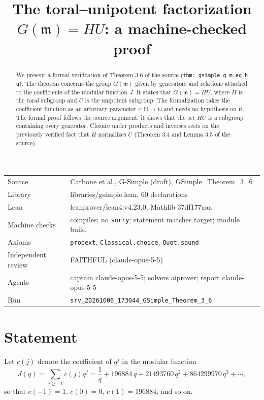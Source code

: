 \documentclass[11pt]{article}
\title{The toral--unipotent factorization $G(\mathfrak{m}) = HU$: a machine-checked proof}
\date{}
\theoremstyle{definition}
\theoremstyle{remark}
\begin{document}
\maketitle
\begin{abstract}
We present a formal verification of Theorem 3.6 of the source (\texttt{thm: gsimple g m eq h u}). The theorem concerns the group $G(\mathfrak{m})$ given by generators and relations attached to the coefficients of the modular function $J$. It states that $G(\mathfrak{m})=HU$, where $H$ is the toral subgroup and $U$ is the unipotent subgroup. The formalization takes the coefficient function as an arbitrary parameter $c\colon\mathbb{N}\to\mathbb{N}$ and needs no hypothesis on it. The formal proof follows the source argument: it shows that the set $HU$ is a subgroup containing every generator. Closure under products and inverses rests on the previously verified fact that $H$ normalizes $U$ (Theorem 3.4 and Lemma 3.5 of the source).
\end{abstract}

\begin{center}\small
\begin{tabular}{@{}ll@{}}
\toprule
Source & Carbone et al., G-Simple (draft), GSimple\_Theorem\_3\_6 \\
Library & libraries/gsimple.lean, 60 declarations \\
Lean & leanprover/lean4:v4.23.0, Mathlib 37df177aaa \\
Machine checks & compiles; no \texttt{sorry}; statement matches target; module build \\
Axioms & \texttt{propext}, \texttt{Classical.choice}, \texttt{Quot.sound} \\
Independent review & FAITHFUL (claude-opus-5-5) \\
Agents & captain claude-opus-5-5; solvers aiprover; report claude-opus-5-5 \\
Run & \texttt{srv\_20261006\_173044\_GSimple\_Theorem\_3\_6} \\
\bottomrule
\end{tabular}
\end{center}

\tableofcontents

\section{Statement}

Let $c(j)$ denote the coefficient of $q^j$ in the modular function
\[
J(q)=\sum_{j\ge -1}c(j)q^j=\frac1q+196884\,q+21493760\,q^2+864299970\,q^3+\cdots,
\]
so that $c(-1)=1$, $c(0)=0$, $c(1)=196884$, and so on.
\end{document}
